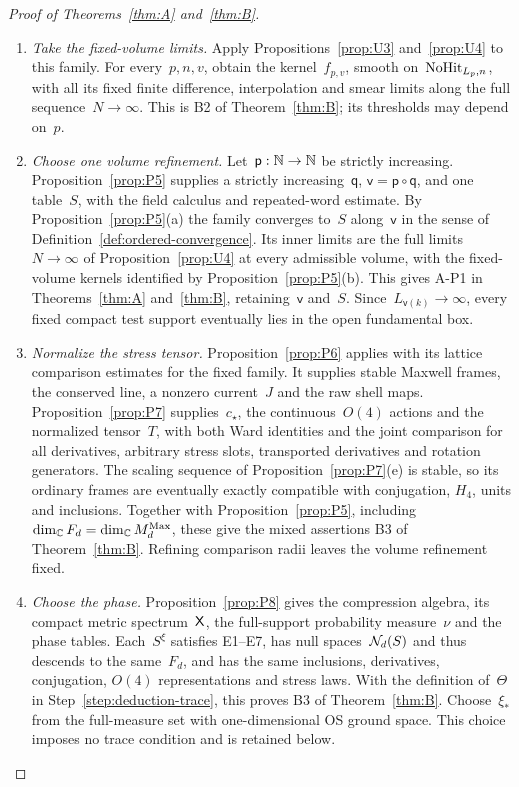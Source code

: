 \begin{proof}[Proof of Theorems~\ref{thm:A} and~\ref{thm:B}]
\begin{enumerate}[label=\emph{Step \arabic*:},ref=\arabic*,leftmargin=4.5em,itemsep=0.4em,beginpenalty=10000]
\item\label{step:deduction-uv} \emph{Take the fixed-volume limits.} Apply Propositions~\ref{prop:U3} and~\ref{prop:U4} to this family. For every~$p,n,v$, obtain the kernel~$f_{p,v}$, smooth on~$\mathrm{NoHit}_{L_p,n}$, with all its fixed finite difference, interpolation and smear limits along the full sequence~$N\to\infty$. This is B2 of Theorem~\ref{thm:B}; its thresholds may depend on~$p$.

\item\label{step:deduction-volume} \emph{Choose one volume refinement.} Let~$\mathsf p:\mathbb{N}\to\mathbb{N}$ be strictly increasing. Proposition~\ref{prop:P5} supplies a strictly increasing~$\mathsf q$, $\mathsf v=\mathsf p\circ\mathsf q$, and one table~$S$, with the field calculus and repeated-word estimate. By Proposition~\ref{prop:P5}(a) the family converges to~$S$ along~$\mathsf v$ in the sense of Definition~\ref{def:ordered-convergence}. Its inner limits are the full limits~$N\to\infty$ of Proposition~\ref{prop:U4} at every admissible volume, with the fixed-volume kernels identified by Proposition~\ref{prop:P5}(b). This gives A-P1 in Theorems~\ref{thm:A} and~\ref{thm:B}, retaining~$\mathsf v$ and~$S$. Since~$L_{\mathsf v(k)}\to\infty$, every fixed compact test support eventually lies in the open fundamental box.

\item\label{step:deduction-stress} \emph{Normalize the stress tensor.} Proposition~\ref{prop:P6} applies with its lattice comparison estimates for the fixed family. It supplies stable Maxwell frames, the conserved line, a nonzero current~$J$ and the raw shell maps. Proposition~\ref{prop:P7} supplies~$c_\star$, the continuous~$O(4)$ actions and the normalized tensor~$T$, with both Ward identities and the joint comparison for all derivatives, arbitrary stress slots, transported derivatives and rotation generators. The scaling sequence of Proposition~\ref{prop:P7}(e) is stable, so its ordinary frames are eventually exactly compatible with conjugation, $H_4$, units and inclusions. Together with Proposition~\ref{prop:P5}, including $\dim_{\mathbb{C}}F_d=\dim_{\mathbb{C}}M_{d}^{\mathrm{Max}}$, these give the mixed assertions B3 of Theorem~\ref{thm:B}. Refining comparison radii leaves the volume refinement fixed.

\item\label{step:deduction-phase} \emph{Choose the phase.} Proposition~\ref{prop:P8} gives the compression algebra, its compact metric spectrum~$\mathsf{X}$, the full-support probability measure~$\nu$ and the phase tables. Each~$S^\xi$ satisfies E1--E7, has null spaces~$\mathcal{N}_{d}(S)$ and thus descends to the same~$F_d$, and has the same inclusions, derivatives, conjugation, $O(4)$ representations and stress laws. With the definition of~$\Theta$ in Step~\ref{step:deduction-trace}, this proves B3 of Theorem~\ref{thm:B}. Choose~$\xi_*$ from the full-measure set with one-dimensional OS ground space. This choice imposes no trace condition and is retained below.


\end{enumerate}
\end{proof}
